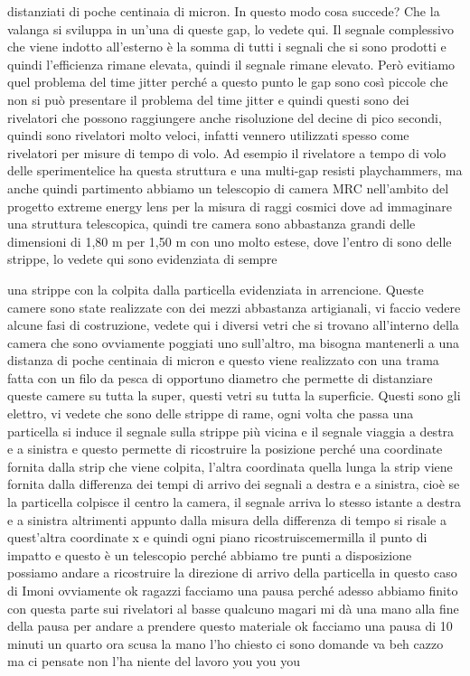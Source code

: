 distanziati di poche centinaia di micron. In questo modo cosa succede? Che la valanga si sviluppa in un'una di queste gap, lo vedete qui. Il segnale complessivo che viene indotto all'esterno è la somma di tutti i segnali che si sono prodotti e quindi l'efficienza rimane elevata, quindi il segnale rimane elevato. Però evitiamo quel problema del time jitter perché a questo punto le gap sono così piccole che non si può presentare il problema del time jitter e quindi questi sono dei rivelatori che possono raggiungere anche risoluzione del decine di pico secondi, quindi sono rivelatori molto veloci, infatti vennero utilizzati spesso come rivelatori per misure di tempo di volo. Ad esempio il rivelatore a tempo di volo delle sperimentelice ha questa struttura e una multi-gap resisti playchammers, ma anche quindi partimento abbiamo un telescopio di camera MRC nell'ambito del progetto extreme energy lens per la misura di raggi cosmici dove ad immaginare una struttura telescopica, quindi tre camera sono abbastanza grandi delle dimensioni di 1,80 m per 1,50 m con uno molto estese, dove l'entro di sono delle strippe, lo vedete qui sono evidenziata di sempre 


una strippe con la colpita dalla particella evidenziata in arrencione. Queste camere sono state realizzate con dei mezzi abbastanza artigianali, vi faccio vedere alcune fasi di costruzione, vedete qui i diversi vetri che si trovano all'interno della camera che sono ovviamente poggiati uno sull'altro, ma bisogna mantenerli a una distanza di poche centinaia di micron e questo viene realizzato con una trama fatta con un filo da pesca di opportuno diametro che permette di distanziare queste camere su tutta la super, questi vetri su tutta la superficie. Questi sono gli elettro, vi vedete che sono delle strippe di rame, ogni volta che passa una particella si induce il segnale sulla strippe più vicina e il segnale viaggia a destra e a sinistra e questo permette di ricostruire la posizione perché una coordinate fornita dalla strip che viene colpita, l'altra coordinata quella lunga la strip viene fornita dalla differenza dei tempi di arrivo dei segnali a destra e a sinistra, cioè se la particella colpisce il centro la camera, il segnale arriva lo stesso istante a destra e a sinistra altrimenti appunto dalla misura della differenza di tempo si risale a quest'altra coordinate x e quindi ogni piano ricostruiscemermilla il punto di impatto e questo è un telescopio perché abbiamo tre punti a disposizione possiamo andare a ricostruire la direzione di arrivo della particella in questo caso di Imoni ovviamente ok ragazzi facciamo una pausa perché adesso abbiamo finito con questa parte sui rivelatori al basse qualcuno magari mi dà una mano alla fine della pausa per andare a prendere questo materiale ok facciamo una pausa di 10 minuti un quarto ora scusa la mano l'ho chiesto ci sono domande va beh cazzo ma ci pensate non l'ha niente del lavoro you you you


